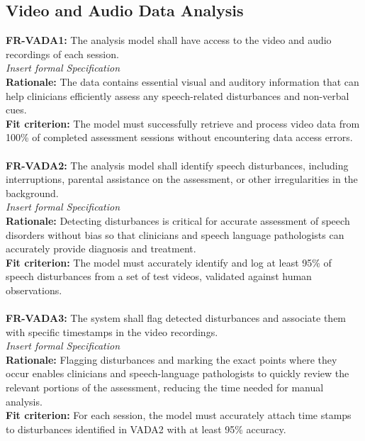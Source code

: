 \documentclass[12pt]{article}
\begin{document}
\subsection{Video and Audio Data Analysis}
\textbf{FR-VADA1: }The analysis model shall have access to the video and audio recordings of each session.\\
\textit{Insert formal Specification}\\
\textbf{Rationale: }The data contains essential visual and auditory information that can help clinicians 
efficiently assess any speech-related disturbances and non-verbal cues.\\
\textbf{Fit criterion: }The model must successfully retrieve and process video data from 100\% of 
completed assessment sessions without encountering data access errors.\\\\
\textbf{FR-VADA2: }The analysis model shall identify speech disturbances, including interruptions, parental 
assistance on the assessment, or other irregularities in the background.\\
\textit{Insert formal Specification}\\
\textbf{Rationale: }Detecting disturbances is critical for accurate assessment of speech disorders without 
bias so that clinicians and speech language pathologists can accurately provide diagnosis and treatment.\\
\textbf{Fit criterion: }The model must accurately identify and log at least 95\% of speech disturbances 
from a set of test videos, validated against human observations.\\\\
\textbf{FR-VADA3: }The system shall flag detected disturbances and associate them with specific timestamps in the 
video recordings.\\
\textit{Insert formal Specification}\\
\textbf{Rationale: }Flagging disturbances and marking the exact points where they occur enables clinicians and 
speech-language pathologists to quickly review the relevant portions of the assessment, reducing the time needed 
for manual analysis.\\
\textbf{Fit criterion: }For each session, the model must accurately attach time stamps to disturbances
identified in VADA2 with at least 95\% accuracy.\\\\
\end{document}
